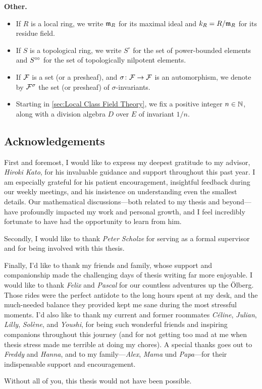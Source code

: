 \documentclass[../main.tex]{subfiles}
\begin{document}
\textbf{Other.}\vspace{-1em}
\begin{itemize}
  \item If $R$ is a local ring, we write $\mathfrak{m}_R$ for its maximal ideal and 
    $k_R = R/\mathfrak{m}_R$ for its residue field. 
  \item If $S$ is a topological ring, we write $S^\circ$ for the set of power-bounded
    elements and $S^{\circ \hspace{-0.5pt} \circ}$ for the set of topologically nilpotent elements.
  \item If $\mathcal{F}$ is a set (or a presheaf), and $\sigma\colon \mathcal{F} \to \mathcal{F}$ is an
    automorphism, we denote by $\mathcal{F}^\sigma$ the set (or presheaf) of 
    $\sigma$-invariants.
  \item Starting in \cref{sec:Local Class Field Theory}, we fix a positive
    integer $n \in \mathbb{N}$, along with a division algebra $D$ over $E$ of invariant $1/n$. 
\end{itemize}


\subsection*{Acknowledgements} %

First and foremost, I would like to express my deepest gratitude to my advisor, \textit{Hiroki Kato}, for his invaluable guidance and support throughout this past year. I am especially grateful for his patient encouragement, insightful feedback during our weekly meetings, and his insistence on understanding even the smallest details. Our mathematical discussions—both related to my thesis and beyond—have profoundly impacted my work and personal growth, and I feel incredibly fortunate to have had the opportunity to learn from him.

Secondly, I would like to thank \textit{Peter Scholze} for serving as a formal supervisor and for being involved with this thesis. 

Finally, I'd like to thank my friends and family, whose support and companionship made the challenging days of thesis writing far more enjoyable. I would like to thank \textit{Felix} and \textit{Pascal} for our countless adventures up the Ölberg. Those rides were the perfect antidote to the long hours spent at my desk, and the much-needed balance they provided kept me sane during the most stressful moments. I'd also like to thank my current and former roommates \textit{C\'eline}, \textit{Julian}, \textit{Lilly}, \textit{Solène}, and \textit{Youshi}, for being such wonderful friends and inspiring companions throughout this
journey (and for not getting too mad at me when thesis stress made me terrible at doing my chores). A special thanks goes out to \textit{Freddy} and \textit{Hanna}, and to my family—\textit{Alex}, \textit{Mama} und \textit{Papa}—for their indispensable support and encouragement.

Without all of you, this thesis would not have been possible. 

\end{document}
